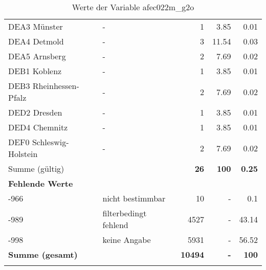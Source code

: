 \begin{longtable}{Xlrrr}
     \multicolumn{1}{X}{DEA3 Münster} &
     - &
     \num{1} &
     \num[round-mode=places,round-precision=2]{3.85} &
     \num[round-mode=places,round-precision=2]{0.01} \\

     \multicolumn{1}{X}{DEA4 Detmold} &
     - &
     \num{3} &
     \num[round-mode=places,round-precision=2]{11.54} &
     \num[round-mode=places,round-precision=2]{0.03} \\

     \multicolumn{1}{X}{DEA5 Arnsberg} &
     - &
     \num{2} &
     \num[round-mode=places,round-precision=2]{7.69} &
     \num[round-mode=places,round-precision=2]{0.02} \\

     \multicolumn{1}{X}{DEB1 Koblenz} &
     - &
     \num{1} &
     \num[round-mode=places,round-precision=2]{3.85} &
     \num[round-mode=places,round-precision=2]{0.01} \\

     \multicolumn{1}{X}{DEB3 Rheinhessen-Pfalz} &
     - &
     \num{2} &
     \num[round-mode=places,round-precision=2]{7.69} &
     \num[round-mode=places,round-precision=2]{0.02} \\

     \multicolumn{1}{X}{DED2 Dresden} &
     - &
     \num{1} &
     \num[round-mode=places,round-precision=2]{3.85} &
     \num[round-mode=places,round-precision=2]{0.01} \\

     \multicolumn{1}{X}{DED4 Chemnitz} &
     - &
     \num{1} &
     \num[round-mode=places,round-precision=2]{3.85} &
     \num[round-mode=places,round-precision=2]{0.01} \\

     \multicolumn{1}{X}{DEF0 Schleswig-Holstein} &
     - &
     \num{2} &
     \num[round-mode=places,round-precision=2]{7.69} &
     \num[round-mode=places,round-precision=2]{0.02} \\
     \midrule
      \multicolumn{2}{l}{Summe (gültig)} & \textbf{\num{26}} &
      \textbf{\num{100}} &
         \textbf{\num[round-mode=places,round-precision=2]{0.25}} \\
     \multicolumn{5}{l}{\textbf{Fehlende Werte}}\\
       -966 & nicht bestimmbar & \num{10} & - & \num[round-mode=places,round-precision=2]{0.1} \\

       -989 & filterbedingt fehlend & \num{4527} & - & \num[round-mode=places,round-precision=2]{43.14} \\

       -998 & keine Angabe & \num{5931} & - & \num[round-mode=places,round-precision=2]{56.52} \\

     \midrule
     \multicolumn{2}{l}{\textbf{Summe (gesamt)}} & \textbf{\num{10494}} & \textbf{-} & \textbf{\num{100}} \\
     \bottomrule
     \caption{Werte der Variable afec022m\_g2o}
     \end{longtable}
     
